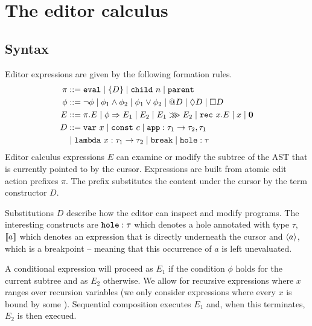 \section{The editor calculus}
\label{sec:editorcalculus}

\subsection{Syntax}

Editor expressions are given by the following formation rules.
%
\begin{align}
    \pi &::= \texttt{eval}
  \mid \{ D \}
  \mid \texttt{child}~n
  \mid \texttt{parent} \label{aep-formation-rules} \\
   \phi &::= \neg\phi
  \mid \phi_1 \land \phi_2
  \mid \phi_1 \lor \phi_2
  \mid @D
  \mid \Diamond D
  \mid \Box D \label{eed-formation-rules} \\
    E &::= \pi.E
  \mid \phi \Rightarrow E_1 \mid E_2
  \mid E_1 \ggg E_2
  \mid \texttt{rec}~x.E
  \mid x
  \mid \mathbf{0} \label{edt-formation-rules} \\
    D & ::= \texttt{var}~x
  \mid \texttt{const}~c
  \mid \texttt{app} : \tau_1\to\tau_2,\tau_1  \label{eq:lan-mod-aam} \\
 &  \mid \texttt{lambda}~x : \tau_1\to\tau_2 \mid \texttt{break}  \mid \texttt{hole} : \tau   \label{aam-formation-rules}
\end{align}
%
Editor calculus expressions $E$ can examine or modify the subtree of the
AST that is currently pointed to by the cursor. Expressions are built
from atomic edit action prefixes $\pi$. The  prefix substitutes
the content under the cursor by the term constructor $D$.

Substitutions $D$ describe how the editor can
inspect and modify programs.
The interesting constructs are
$\texttt{hole} : \tau$ which denotes a hole annotated with type
$\tau$, $\llbracket a \rrbracket$ which denotes an expression that is directly
underneath the cursor and $\langle a \rangle$, which is a breakpoint --
meaning that this occurrence of $a$ is left unevaluated.

A conditional expression  will proceed as $E_1$
if the condition $\phi$ holds for the current subtree and as $E_2$
otherwise. We allow for recursive expressions  where $x$
ranges over recursion variables (we only consider expressions where
every $x$ is bound by some ). Sequential composition
 executes $E_1$ and, when this terminates, $E_2$ is
then execued.

